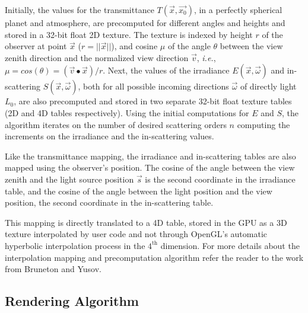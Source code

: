 \documentclass[journal]{vgtc}                %
\begin{document}
Initially, the values for the transmittance $T(\vec{x}, \vec{x_0})$, in a perfectly spherical planet and atmosphere, are precomputed for different angles and heights and stored in a 32-bit float 2D texture. The texture is indexed by height $r$ of the observer at point $\vec{x}$ ($r = ||\vec{x}||$), and cosine $\mu$ of the angle $\theta$ between the view zenith direction and the normalized view direction $\vec{v}$, \textit{i.e.}, $\mu = cos(\theta) = (\vec{v}\bullet\vec{x})/r$. Next, the values of the irradiance $E(\vec{x}, \vec{\omega})$ and in-scattering $S(\vec{x}, \vec{\omega})$, both for all possible incoming directions $\vec{\omega}$ of directly light $L_0$, are also precomputed and stored in two separate 32-bit float texture tables (2D and 4D tables respectively). Using the initial computations for $E$ and $S$, the algorithm iterates on the number of desired scattering orders $n$ computing the increments on the irradiance and the in-scattering values.

Like the transmittance mapping, the irradiance and in-scattering tables are also mapped using the observer's position. The cosine of the angle between the view zenith and the light source position $\vec{s}$ %
is the second coordinate in the irradiance table, and the cosine of the angle between the light position and the view position, the second coordinate in the in-scattering table.

%
%
This mapping is directly translated to a 4D table, stored in the GPU as a 3D texture interpolated by user code and not through OpenGL's automatic hyperbolic interpolation process in the $4^{\text{th}}$ dimension.
%
For more details about the interpolation mapping and precomputation algorithm refer the reader to the work from Bruneton\cite{BrunetonNeyret:2008} and Yusov\cite{Yusov:2013}.

\vspace*{-1mm}
\subsection{Rendering Algorithm}
\end{document}

